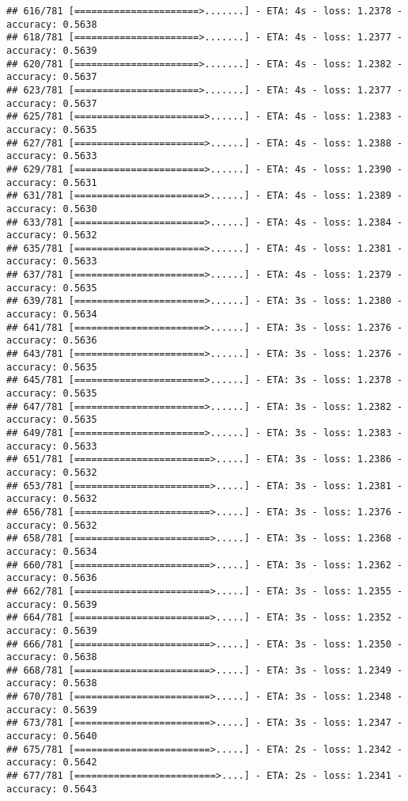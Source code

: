 \documentclass[
]{article}
\begin{document}
\begin{verbatim}
## 616/781 [======================>.......] - ETA: 4s - loss: 1.2378 - accuracy: 0.5638
## 618/781 [======================>.......] - ETA: 4s - loss: 1.2377 - accuracy: 0.5639
## 620/781 [======================>.......] - ETA: 4s - loss: 1.2382 - accuracy: 0.5637
## 623/781 [======================>.......] - ETA: 4s - loss: 1.2377 - accuracy: 0.5637
## 625/781 [=======================>......] - ETA: 4s - loss: 1.2383 - accuracy: 0.5635
## 627/781 [=======================>......] - ETA: 4s - loss: 1.2388 - accuracy: 0.5633
## 629/781 [=======================>......] - ETA: 4s - loss: 1.2390 - accuracy: 0.5631
## 631/781 [=======================>......] - ETA: 4s - loss: 1.2389 - accuracy: 0.5630
## 633/781 [=======================>......] - ETA: 4s - loss: 1.2384 - accuracy: 0.5632
## 635/781 [=======================>......] - ETA: 4s - loss: 1.2381 - accuracy: 0.5633
## 637/781 [=======================>......] - ETA: 4s - loss: 1.2379 - accuracy: 0.5635
## 639/781 [=======================>......] - ETA: 3s - loss: 1.2380 - accuracy: 0.5634
## 641/781 [=======================>......] - ETA: 3s - loss: 1.2376 - accuracy: 0.5636
## 643/781 [=======================>......] - ETA: 3s - loss: 1.2376 - accuracy: 0.5635
## 645/781 [=======================>......] - ETA: 3s - loss: 1.2378 - accuracy: 0.5635
## 647/781 [=======================>......] - ETA: 3s - loss: 1.2382 - accuracy: 0.5635
## 649/781 [=======================>......] - ETA: 3s - loss: 1.2383 - accuracy: 0.5633
## 651/781 [========================>.....] - ETA: 3s - loss: 1.2386 - accuracy: 0.5632
## 653/781 [========================>.....] - ETA: 3s - loss: 1.2381 - accuracy: 0.5632
## 656/781 [========================>.....] - ETA: 3s - loss: 1.2376 - accuracy: 0.5632
## 658/781 [========================>.....] - ETA: 3s - loss: 1.2368 - accuracy: 0.5634
## 660/781 [========================>.....] - ETA: 3s - loss: 1.2362 - accuracy: 0.5636
## 662/781 [========================>.....] - ETA: 3s - loss: 1.2355 - accuracy: 0.5639
## 664/781 [========================>.....] - ETA: 3s - loss: 1.2352 - accuracy: 0.5639
## 666/781 [========================>.....] - ETA: 3s - loss: 1.2350 - accuracy: 0.5638
## 668/781 [========================>.....] - ETA: 3s - loss: 1.2349 - accuracy: 0.5638
## 670/781 [========================>.....] - ETA: 3s - loss: 1.2348 - accuracy: 0.5639
## 673/781 [========================>.....] - ETA: 3s - loss: 1.2347 - accuracy: 0.5640
## 675/781 [========================>.....] - ETA: 2s - loss: 1.2342 - accuracy: 0.5642
## 677/781 [=========================>....] - ETA: 2s - loss: 1.2341 - accuracy: 0.5643

\end{verbatim}
\end{document}
